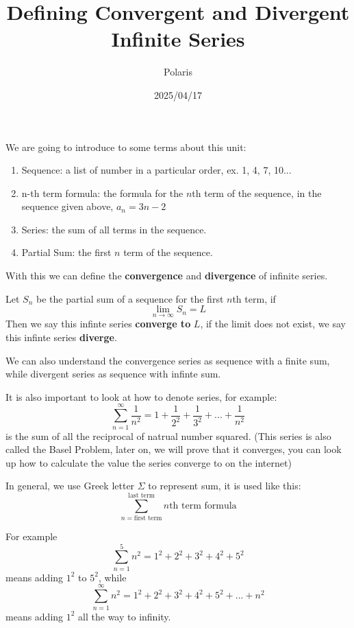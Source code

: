 \documentclass{article}
\title{Defining Convergent and Divergent Infinite Series}
\author{Polaris}
\date{2025/04/17}
\numberwithin{equation}{section}
\begin{document}
\maketitle

We are going to introduce to some terms about this unit:
\begin{enumerate}
    \item Sequence: a list of number in a particular order, ex. {1, 4, 7, 10...}
    \item n-th term formula: the formula for the $n$th term of the sequence, in the sequence given above, $a_n = 3n - 2$
    \item Series: the sum of all terms in the sequence.
    \item Partial Sum: the first $n$ term of the sequence.
\end{enumerate}

With this we can define the \textbf{convergence} and \textbf{divergence} of infinite series.

Let $S_n$ be the partial sum of a sequence for the first $n$th term, if 
\[
\lim_{n\to \infty}S_n = L
\]
Then we say this infinte series \textbf{converge to} $L$, if the limit does not exist, we say this infinte series \textbf{diverge}.

We can also understand the convergence series as sequence with a finite sum, while divergent series as sequence with infinte sum.

It is also important to look at how to denote series, for example:
\[
\sum_{n=1}^{\infty} \frac{1}{n^2} = 1+ \frac{1}{2^2} + \frac{1}{3^2} + ... + \frac{1}{n^2}
\]
is the sum of all the reciprocal of natrual number squared. 
(This series is also called the Basel Problem, later on, we will prove that it converges, you can look up how to calculate the value the series converge to on the internet)

In general, we use Greek letter $\displaystyle \Sigma$ to represent sum, it is used like this:
\[
\sum_{n=\text{first term}}^{\text{last term}} n\text{th term formula}
\]

For example
\[
\sum_{n = 1}^{5} n^2 = 1^2 + 2^2 + 3^2 + 4^2 + 5^2
\]
means adding $1^2$ to $5^2$, while
\[
\sum_{n = 1}^{\infty} n^2 = 1^2 + 2^2 + 3^2 + 4^2 + 5^2 + ... + n^2
\]
means adding $1^2$ all the way to infinity.
\end{document}
